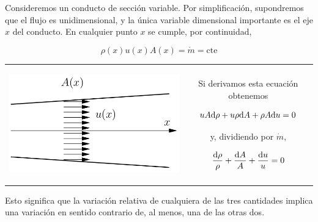 	
	Consideremos un conducto de sección variable. Por simplificación,
	supondremos que el flujo es unidimensional, y la única variable dimensional
	importante es el eje $x$ del conducto. En cualquier punto $x$ se
	cumple, por continuidad, 
	
\begin{equation}
		\rho(x)u(x)A(x)=\dot{m}=\text{cte}
\end{equation}
	
	\begin{tabular}{cc}
		\begin{minipage}[c]{0.4\textwidth}%
			\begin{center}
				\includegraphics[width=\linewidth]{TeX_files/chapter11-Compresible/conducto1}
			\end{center}
		\end{minipage} & %
		\begin{minipage}[c]{0.6\textwidth}%
			Si derivamos esta ecuación obtenemos 
			
\begin{equation}
				uA\text{d}\rho+u\rho\text{d} A+\rho A\text{d} u=0
\end{equation}
			
			y, dividiendo por $\dot{m}$, 
			
\begin{equation}
				\frac{\text{d}\rho}{\rho}+\frac{\text{d} A}{A}+\frac{\text{d} u}{u}=0
\end{equation}
			
		\end{minipage}\tabularnewline
	\end{tabular}
	
	\medskip{}
	Esto significa que la variación relativa de cualquiera de las tres
	cantidades implica una variación en sentido contrario de, al menos,
	una de las otras dos.

